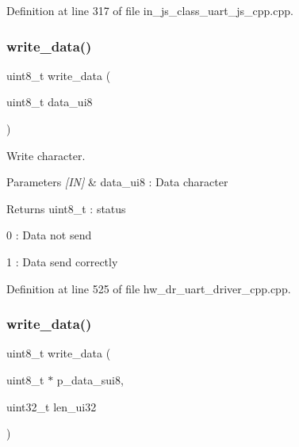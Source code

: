 Definition at line 317 of file in\+\_\+js\+\_\+class\+\_\+uart\+\_\+js\+\_\+cpp.\+cpp.

\mbox{\label{group___u_a_r_t_gab8445a3d538e13b197f85947402017b7}} 
\subsubsection{write\_data()\hspace{0.1cm}{\footnotesize\ttfamily [1/3]}}
{\footnotesize\ttfamily uint8\+\_\+t write\+\_\+data (\begin{DoxyParamCaption}\item[{uint8\+\_\+t}]{data\+\_\+ui8 }\end{DoxyParamCaption})}



Write character. 


\begin{DoxyParams}{Parameters}
{\em \mbox{[}\+I\+N\mbox{]}} & data\+\_\+ui8 \+: Data character \\
\hline
\end{DoxyParams}
\begin{DoxyReturn}{Returns}
uint8\+\_\+t \+: status \begin{DoxyItemize}
\item 0 \+: Data not send \item 1 \+: Data send correctly \end{DoxyItemize}

\end{DoxyReturn}


Definition at line 525 of file hw\+\_\+dr\+\_\+uart\+\_\+driver\+\_\+cpp.\+cpp.

\mbox{\label{group___u_a_r_t_ga8762971ac744aeeac19b05e0b034134c}} 
\subsubsection{write\_data()\hspace{0.1cm}{\footnotesize\ttfamily [2/3]}}
{\footnotesize\ttfamily uint8\+\_\+t write\+\_\+data (\begin{DoxyParamCaption}\item[{uint8\+\_\+t $\ast$}]{p\+\_\+data\+\_\+sui8,  }\item[{uint32\+\_\+t}]{len\+\_\+ui32 }\end{DoxyParamCaption})}



